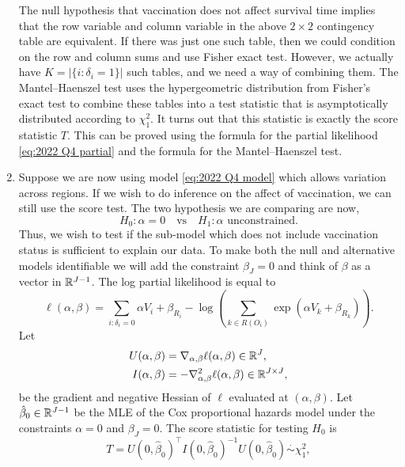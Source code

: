 \begin{enumerate}[label=(\alph*)]
\begin{table}[h]
\begin{center}
\begin{tabular}{|p{2.5cm}|p{5cm}|p{5cm}|}
        \hline 
        \end{tabular}
    \end{center}
    \end{table}
    The null hypothesis that vaccination does not affect survival time implies that the row variable and column variable in the above $2 \times 2$ contingency table are equivalent. If there was just one such table, then we could condition on the row and column sums and use Fisher exact test. However, we actually have $K=|\{i:\delta_i=1\}|$ such tables, and we need a way of combining them. The Mantel--Haenszel test uses the hypergeometric distribution from Fisher's exact test to combine these tables into a test statistic that is asymptotically distributed according to $\chi^2_1$. It turns out that this statistic is exactly the score statistic $T$. This can be proved using the formula for the partial likelihood \eqref{eq:2022 Q4 partial} and the formula for the Mantel--Haenszel test.
    \item Suppose we are now using model \eqref{eq:2022 Q4 model} which allows variation across regions. If we wish to do inference on the affect of vaccination, we can still use the score test. The two hypothesis we are comparing are now,
    \[H_0 : \alpha = 0 \quad \text{vs} \quad H_1 : \alpha \text{ unconstrained}. \]
    Thus, we wish to test if the sub-model which does not include vaccination status is sufficient to explain our data.  To make both the null and alternative models identifiable we will add the constraint $\beta_J=0$ and think of $\beta$ as a vector in $\mathbb{R}^{J-1}$. The log partial likelihood is equal to 
    \[\ell(\alpha,\beta) = \sum_{i:\delta_i =0}\alpha V_i +\beta_{R_i} - \log\left(\sum_{k \in R(O_i)}\exp\left(\alpha V_k + \beta_{R_k}\right)\right).  \]
    Let 
    \begin{align*}
        U(\alpha,\beta)&=\nabla_{\alpha,\beta}\ell(\alpha,\beta) \in \mathbb{R}^{J},\\
        I(\alpha,\beta)&=-\nabla_{\alpha,\beta}^2\ell(\alpha,\beta) \in \mathbb{R}^{J \times J},
    \end{align*}
    be the gradient and negative Hessian of $\ell$ evaluated at $(\alpha,\beta)$. Let $\hat{\beta}_0 \in \mathbb{R}^{J-1}$ be the MLE of the Cox proportional hazards model under the constraints $\alpha = 0$ and $\beta_J=0$. The score statistic for testing $H_0$ is
    \begin{equation}\label{eq:2022 Q4 score}T = U(0,\hat{\beta}_0)^\top I(0,\hat{\beta}_0)^{-1} U(0,\hat{\beta}_0) \stackrel{\cdot}{\sim} \chi^2_1, \end{equation}

\end{enumerate}
